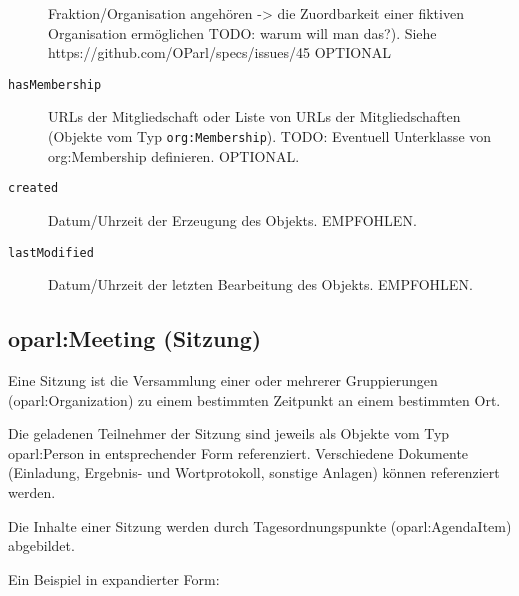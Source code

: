 \documentclass[,a4paper]{article}
\begin{document}
\begin{description}
Fraktion/Organisation angehören -\textgreater{} die Zuordbarkeit einer
fiktiven Organisation ermöglichen TODO: warum will man das?). Siehe
https://github.com/OParl/specs/issues/45 OPTIONAL
\item[\texttt{hasMembership}]
URLs der Mitgliedschaft oder Liste von URLs der Mitgliedschaften
(Objekte vom Typ \texttt{org:Membership}). TODO: Eventuell Unterklasse
von org:Membership definieren. OPTIONAL.
\item[\texttt{created}]
Datum/Uhrzeit der Erzeugung des Objekts. EMPFOHLEN.
\item[\texttt{lastModified}]
Datum/Uhrzeit der letzten Bearbeitung des Objekts. EMPFOHLEN.
\end{description}

\subsection{oparl:Meeting (Sitzung)}\label{oparlux5fmeeting}

Eine Sitzung ist die Versammlung einer oder mehrerer Gruppierungen
(oparl:Organization) zu einem bestimmten Zeitpunkt an einem bestimmten
Ort.

Die geladenen Teilnehmer der Sitzung sind jeweils als Objekte vom Typ
oparl:Person in entsprechender Form referenziert. Verschiedene Dokumente
(Einladung, Ergebnis- und Wortprotokoll, sonstige Anlagen) können
referenziert werden.

Die Inhalte einer Sitzung werden durch Tagesordnungspunkte
(oparl:AgendaItem) abgebildet.

Ein Beispiel in expandierter Form:
\end{document}
